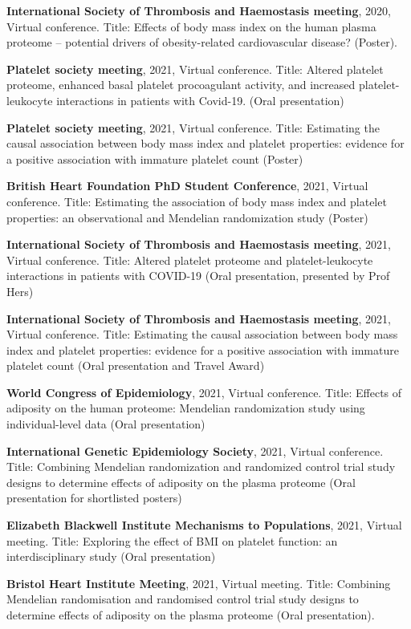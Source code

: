 \documentclass[11pt,twoside]{bristolthesis}
\begin{document}
\textbf{International Society of Thrombosis and Haemostasis meeting}, 2020, Virtual conference. Title: Effects of body mass index on the human plasma proteome -- potential drivers of obesity-related cardiovascular disease? (Poster).

\textbf{Platelet society meeting}, 2021, Virtual conference. Title: Altered platelet proteome, enhanced basal platelet procoagulant activity, and increased platelet-leukocyte interactions in patients with Covid-19. (Oral presentation)

\textbf{Platelet society meeting}, 2021, Virtual conference. Title: Estimating the causal association between body mass index and platelet properties: evidence for a positive association with immature platelet count (Poster)

\textbf{British Heart Foundation PhD Student Conference}, 2021, Virtual conference. Title: Estimating the association of body mass index and platelet properties: an observational and Mendelian randomization study (Poster)

\textbf{International Society of Thrombosis and Haemostasis meeting}, 2021, Virtual conference. Title: Altered platelet proteome and platelet-leukocyte interactions in patients with COVID-19 (Oral presentation, presented by Prof Hers)

\textbf{International Society of Thrombosis and Haemostasis meeting}, 2021, Virtual conference. Title: Estimating the causal association between body mass index and platelet properties: evidence for a positive association with immature platelet count (Oral presentation and Travel Award)

\textbf{World Congress of Epidemiology}, 2021, Virtual conference. Title: Effects of adiposity on the human proteome: Mendelian randomization study using individual-level data (Oral presentation)

\textbf{International Genetic Epidemiology Society}, 2021, Virtual conference. Title: Combining Mendelian randomization and randomized control trial study designs to determine effects of adiposity on the plasma proteome (Oral presentation for shortlisted posters)

\textbf{Elizabeth Blackwell Institute Mechanisms to Populations}, 2021, Virtual meeting. Title: Exploring the effect of BMI on platelet function: an interdisciplinary study (Oral presentation)

\textbf{Bristol Heart Institute Meeting}, 2021, Virtual meeting. Title: Combining Mendelian randomisation and randomised control trial study designs to determine effects of adiposity on the plasma proteome (Oral presentation).
\end{document}
